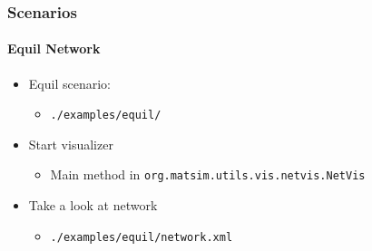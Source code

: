 \begin{frame}[fragile]
\frametitle{Scenarios}
\framesubtitle{Equil Network}
\begin{itemize}
  \item Equil scenario:
  \begin{itemize}
  	\item \verb|./examples/equil/|
  \end{itemize}
  \item Start visualizer
  \begin{itemize}
  	\item Main method in \verb|org.matsim.utils.vis.netvis.NetVis|
  \end{itemize}
  \item Take a look at network
  \begin{itemize}
  	\item \verb|./examples/equil/network.xml|
  \end{itemize}
\end{itemize}
\end{frame}